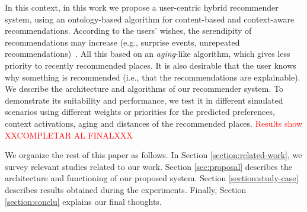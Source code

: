 In this context, in this work we propose a user-centric hybrid recommender system, using an ontology-based algorithm for content-based and context-aware recommendations. According to the users’ wishes, the serendipity of recommendations may increase (e.g., surprise events, unrepeated recommendations)~\cite{kotkov2016survey}. All this based on an {\it aging}-like algorithm, which gives less priority to recently recommended places.  It is also desirable that the user knows why something is recommended (i.e., that the recommendations are explainable). We describe the architecture and algorithms of our recommender system. To demonstrate its suitability and performance, we test it in different simulated scenarios using different weights or priorities for the predicted preferences, context activations, aging and distances of the recommended places. \textcolor{red}{Results show XXCOMPLETAR AL FINALXXX}

We organize the rest of this paper as follows. In Section \ref{section:related-work}, we survey 
relevant studies related to our work.
Section \ref{sec:proposal} describes the architecture and functioning of our proposed system. Section \ref{section:study-case} describes results obtained during the experiments. Finally, Section \ref{section:conclu} explains our final thoughts.


